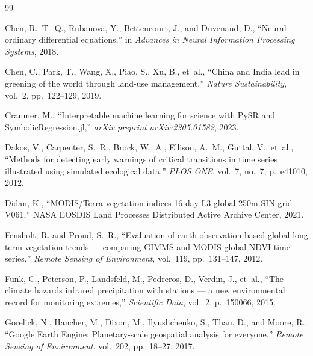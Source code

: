 \documentclass[12pt, a4paper]{article}
\begin{document}
\begin{thebibliography}{99}


Chen, R.~T.~Q., Rubanova, Y., Bettencourt, J., and Duvenaud, D.,
``Neural ordinary differential equations,''
in \emph{Advances in Neural Information Processing Systems}, 2018.

Chen, C., Park, T., Wang, X., Piao, S., Xu, B., et~al.,
``China and India lead in greening of the world through land-use management,''
\emph{Nature Sustainability}, vol.~2, pp.~122--129, 2019.

Cranmer, M.,
``Interpretable machine learning for science with PySR and SymbolicRegression.jl,''
\emph{arXiv preprint arXiv:2305.01582}, 2023.

Dakos, V., Carpenter, S.~R., Brock, W.~A., Ellison, A.~M., Guttal, V., et~al.,
``Methods for detecting early warnings of critical transitions in time series illustrated using simulated ecological data,''
\emph{PLOS ONE}, vol.~7, no.~7, p.~e41010, 2012.

Didan, K.,
``MODIS/Terra vegetation indices 16-day L3 global 250m SIN grid V061,''
NASA EOSDIS Land Processes Distributed Active Archive Center, 2021.


Fensholt, R. and Proud, S.~R.,
``Evaluation of earth observation based global long term vegetation trends --- comparing GIMMS and MODIS global NDVI time series,''
\emph{Remote Sensing of Environment}, vol.~119, pp.~131--147, 2012.

Funk, C., Peterson, P., Landsfeld, M., Pedreros, D., Verdin, J., et~al.,
``The climate hazards infrared precipitation with stations --- a new environmental record for monitoring extremes,''
\emph{Scientific Data}, vol.~2, p.~150066, 2015.

Gorelick, N., Hancher, M., Dixon, M., Ilyushchenko, S., Thau, D., and Moore, R.,
``Google Earth Engine: Planetary-scale geospatial analysis for everyone,''
\emph{Remote Sensing of Environment}, vol.~202, pp.~18--27, 2017.


\end{thebibliography}
\end{document}

